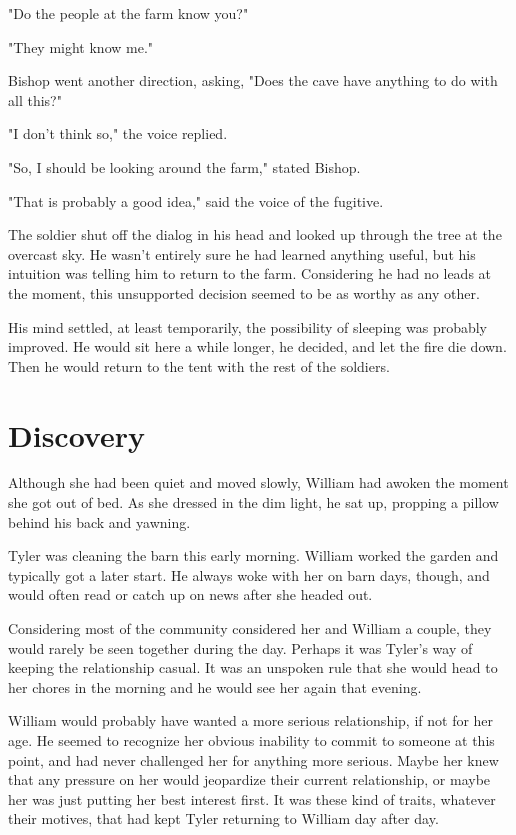 \documentclass[courier]{sffms}
\begin{document}
"Do the people at the farm know you?"

"They might know me."

Bishop went another direction, asking, 
"Does the cave have anything to do with
all this?"

"I don't think so," the voice replied.

"So, I should be looking around the farm,"
stated Bishop.

"That is probably a good idea," said the
voice of the fugitive.

The soldier shut off the dialog in his head
and looked up through the tree at the overcast sky.
He wasn't entirely sure he had learned anything
useful, but his intuition was telling him to
return to the farm. Considering he had no leads
at the moment, this unsupported decision
seemed to be as worthy as any other.

His mind settled, at least temporarily, 
the possibility of sleeping was probably
improved. He would sit here a while
longer, he decided, and let the fire die
down. Then he would return to the tent
with the rest of the soldiers.

\chapter{Discovery}
Although she had been quiet and moved
slowly, William had awoken the moment she
got out of bed. As she dressed in the dim
light, he sat up, propping a pillow behind
his back and yawning.

Tyler was cleaning the barn this early morning.
William worked the garden and typically got
a later start. He always woke with her on
barn days, though, and would often read or
catch up on news after she headed out.

Considering most of the community considered
her and William a couple, they would rarely be
seen together during the day. Perhaps it was
Tyler's way of keeping the relationship casual.
It was an unspoken rule that she would head
to her chores in the morning and he would see
her again that evening.

William would probably have wanted a more
serious relationship, if not for her age. He seemed
to recognize her obvious inability to commit
to someone at this point, and had never
challenged her for anything more serious.
Maybe her knew that any pressure on her
would jeopardize their current relationship, or 
maybe her was just putting her best interest
first. It was these kind of traits, whatever
their motives, that had kept Tyler returning to
William day after day.
\end{document}

